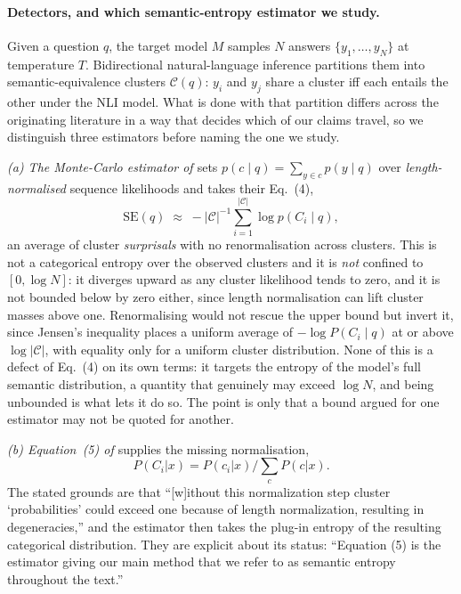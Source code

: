 \label{sec:methods}

\paragraph{Detectors, and which semantic-entropy estimator we study.}
Given a question $q$, the target model $M$ samples $N$ answers
$\{y_1,\dots,y_N\}$ at temperature $T$. Bidirectional natural-language
inference partitions them into semantic-equivalence clusters
$\mathcal{C}(q)$: $y_i$ and $y_j$ share a cluster iff each entails the other
under the NLI model. What is done with that partition differs across the originating
literature in a way that decides which of our claims travel, so we distinguish three
estimators before naming the one we study.

\emph{(a) The Monte-Carlo estimator of \citet{kuhn2023semantic}} sets
$p(c \mid q) = \sum_{y \in c} p(y \mid q)$ over \emph{length-normalised} sequence
likelihoods and takes their Eq.~(4),
\[
\mathrm{SE}(q) \;\approx\; -|\mathcal{C}|^{-1} \sum_{i=1}^{|\mathcal{C}|} \log p(C_i \mid q),
\]
an average of cluster \emph{surprisals} with no renormalisation across clusters. This is not
a categorical entropy over the observed clusters and it is \emph{not} confined to
$[0, \log N]$: it diverges upward as any cluster likelihood tends to zero, and it is not
bounded below by zero either, since length normalisation can lift cluster masses above one.
Renormalising would not rescue the upper bound but invert it, since Jensen's inequality places
a uniform average of $-\log P(C_i \mid q)$ at or above $\log|\mathcal{C}|$, with equality only
for a uniform cluster distribution. None of this is a defect of Eq.~(4) on its own terms: it
targets the entropy of the model's full semantic distribution, a quantity that genuinely may
exceed $\log N$, and being unbounded is what lets it do so. The point is only that a bound
argued for one estimator may not be quoted for another.

\emph{(b) Equation~(5) of \citet{farquhar2024detecting}} supplies the missing normalisation,
\[
P(C_i|x) = P(c_i|x) / \sum_c P(c|x).
\]
The stated grounds are that ``[w]ithout this
normalization step cluster `probabilities' could exceed one because of length normalization,
resulting in degeneracies,'' and the estimator then takes the plug-in entropy of the
resulting categorical distribution. They are explicit about its status: ``Equation (5) is
the estimator giving our main method that we refer to as semantic entropy throughout the
text.''

